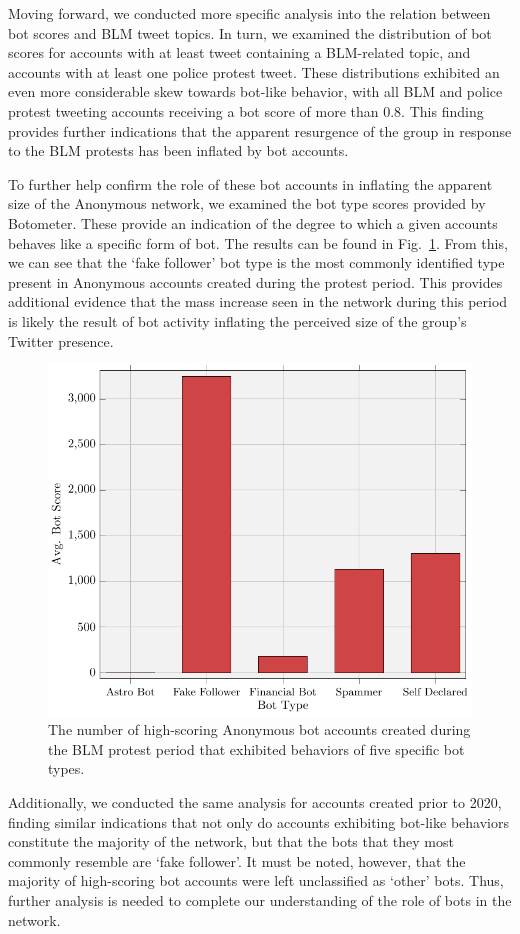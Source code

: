 \documentclass[letterpaper]{article}
\begin{document}
Moving forward, we conducted more specific analysis into the relation between bot scores and BLM tweet topics. In turn, we examined the distribution of bot scores for accounts with at least tweet containing a BLM-related topic, and accounts with at least one police protest tweet. These distributions exhibited an even more considerable skew towards bot-like behavior, with all BLM and police protest tweeting accounts receiving a bot score of more than 0.8. This finding provides further indications that the apparent resurgence of the group in response to the BLM protests has been inflated by bot accounts.

To further help confirm the role of these bot accounts in inflating the apparent size of the Anonymous network, we examined the bot type scores provided by Botometer. These provide an indication of the degree to which a given accounts behaves like a specific form of bot. The results can be found in Fig.~\ref{fig:botTypes}. From this, we can see that the `fake follower' bot type is the most commonly identified type present in Anonymous accounts created during the protest period. This provides additional evidence that the mass increase seen in the network during this period is likely the result of bot activity inflating the perceived size of the group's Twitter presence.

\begin{figure}[!ht]
\centering
\includegraphics[width=0.6\linewidth]{bot_types.pdf}
\caption{The number of high-scoring Anonymous bot accounts created during the BLM protest period that exhibited behaviors of five specific bot types.}
\label{fig:botTypes}
\end{figure}

Additionally, we conducted the same analysis for accounts created prior to 2020, finding similar indications that not only do accounts exhibiting bot-like behaviors constitute the majority of the network, but that the bots that they most commonly resemble are `fake follower'. It must be noted, however, that the majority of high-scoring bot accounts were left unclassified as `other' bots. Thus, further analysis is needed to complete our understanding of the role of bots in the network.
\end{document}
